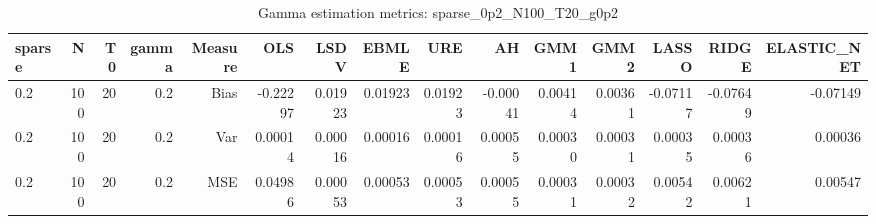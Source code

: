 \begin{table}[!htbp]\centering
\caption{Gamma estimation metrics: sparse_0p2_N100_T20_g0p2}
\label{tab:table1_sparse_0p2_N100_T20_g0p2}
\begin{tabular}{lrrrrrrrrrrrrrr}
\hline
sparse & N & T0 & gamma & Measure & OLS & LSDV & EBMLE & URE & AH & GMM1 & GMM2 & LASSO & RIDGE & ELASTIC_NET \\
\hline
0.2 & 100 & 20 & 0.2 & Bias & -0.22297 & 0.01923 & 0.01923 & 0.01923 & -0.00041 & 0.00414 & 0.00361 & -0.07117 & -0.07649 & -0.07149 \\
0.2 & 100 & 20 & 0.2 & Var & 0.00014 & 0.00016 & 0.00016 & 0.00016 & 0.00055 & 0.00030 & 0.00031 & 0.00035 & 0.00036 & 0.00036 \\
0.2 & 100 & 20 & 0.2 & MSE & 0.04986 & 0.00053 & 0.00053 & 0.00053 & 0.00055 & 0.00031 & 0.00032 & 0.00542 & 0.00621 & 0.00547 \\
\hline
\end{tabular}
\end{table}

